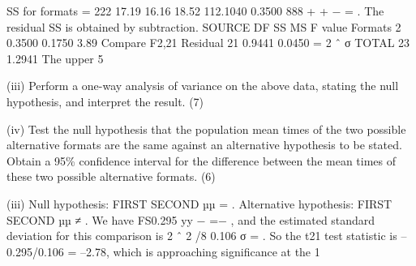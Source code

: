 \documentclass[a4paper,12pt]{article}
\begin{document}
SS for formats = 
222 17.19 16.16 18.52 112.1040 0.3500 888 + + − = . 
 The residual SS is obtained by subtraction. 
 SOURCE DF SS MS F value Formats   2 0.3500 0.1750      3.89   Compare F2,21 Residual 21 0.9441 0.0450 = 2 ˆ σ
 TOTAL 23 1.2941   
 The upper 5%
\newpage

\begin{framed}
(iii) Perform a one-way analysis of variance on the above data, stating the null hypothesis, and interpret the result. (7) 
 
(iv) Test the null hypothesis that the population mean times of the two possible alternative formats are the same against an alternative hypothesis to be stated.  Obtain a 95\% confidence interval for the difference between the mean times of these two possible alternative formats. (6) 

\end{framed}
(iii) Null hypothesis:  FIRST SECOND µµ = .  Alternative hypothesis:  FIRST SECOND µµ ≠ . 
 We have FS0.295 yy − =− , and the estimated standard deviation for this comparison is 2 ˆ 2 /8 0.106 σ = .  So the t21 test statistic is –0.295/0.106 = –2.78, which is approaching significance at the 1%
 
 
\end{document}
